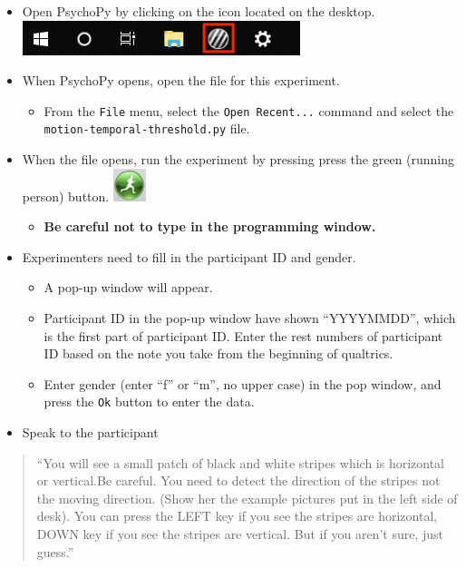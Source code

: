 \documentclass[]{article}
\providecommand{\tightlist}{%
  \setlength{\itemsep}{0pt}\setlength{\parskip}{0pt}}
\begin{document}
\begin{itemize}
\tightlist
\item
  Open PsychoPy by clicking on the icon located on the desktop.
  \includegraphics{images/PsychoPy-1.PNG}\\
\item
  When PsychoPy opens, open the file for this experiment.

  \begin{itemize}
  \tightlist
  \item
    From the \texttt{File} menu, select the \texttt{Open\ Recent...}
    command and select the \texttt{motion-temporal-threshold.py} file.
  \end{itemize}
\item
  When the file opens, run the experiment by pressing press the green
  (running person) button. \includegraphics{images/PPrunningMan.png}

  \begin{itemize}
  \tightlist
  \item
    \textbf{Be careful not to type in the programming window.}
  \end{itemize}
\item
  Experimenters need to fill in the participant ID and gender.

  \begin{itemize}
  \tightlist
  \item
    A pop-up window will appear.
  \item
    Participant ID in the pop-up window have shown ``YYYYMMDD'', which
    is the first part of participant ID. Enter the rest numbers of
    participant ID based on the note you take from the beginning of
    qualtrics.
  \item
    Enter gender (enter ``f'' or ``m'', no upper case) in the pop
    window, and press the \texttt{Ok} button to enter the data.
  \end{itemize}
\item
  Speak to the participant
\end{itemize}

\begin{quote}
``You will see a small patch of black and white stripes which is
horizontal or vertical.Be careful. You need to detect the direction of
the stripes not the moving direction. (Show her the example pictures put
in the left side of desk). You can press the LEFT key if you see the
stripes are horizontal, DOWN key if you see the stripes are vertical.
But if you aren't sure, just guess.''
\end{quote}
\end{document}
